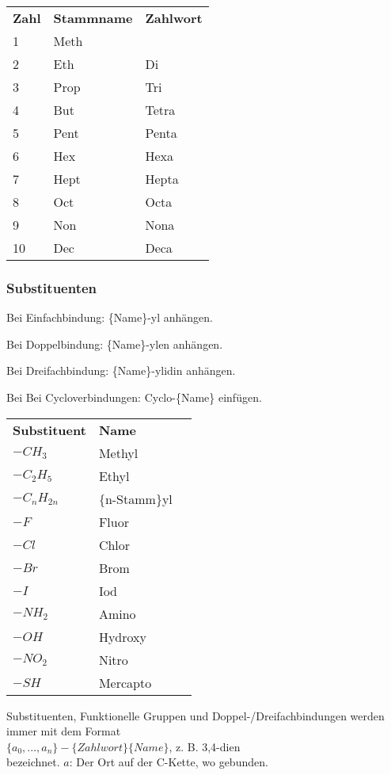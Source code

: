 \begin{center}
	\begin{tabular}{ l  l  l }
		\textbf{Zahl} & \textbf{Stammname} & \textbf{Zahlwort} \\
		1 & Meth & \\
		2 & Eth & Di\\
		3 & Prop & Tri\\
		4 & But & Tetra\\
		5 & Pent & Penta\\
		6 & Hex & Hexa\\
		7 & Hept & Hepta\\
		8 & Oct & Octa\\
		9 & Non &Nona\\
		10 & Dec &Deca\\
	\end{tabular}
\end{center}

\subsubsection{Substituenten}

Bei Einfachbindung: \{Name\}-yl anhängen.

Bei Doppelbindung:  \{Name\}-ylen anhängen.

Bei Dreifachbindung:  \{Name\}-ylidin anhängen.

Bei Bei Cycloverbindungen:  Cyclo-\{Name\} einfügen.

\begin{center}
	\begin{tabular}{ l  l  l }
		\textbf{Substituent} & \textbf{Name} \\
		$-CH_3$ & Methyl \\
		$-C_2H_5$ & Ethyl \\
		$-C_nH_{2n}$ & \{n-Stamm\}yl \\
		$-F$ & Fluor \\
		$-Cl$ & Chlor \\
		$-Br$ & Brom \\
		$-I$ & Iod \\
		$-NH_2$ & Amino \\
		$-OH$ & Hydroxy \\
		$-NO_2$ & Nitro \\
		$-SH$ & Mercapto \\
	\end{tabular}
\end{center}

\begin{note}
	Substituenten, Funktionelle Gruppen und Doppel-/Dreifachbindungen werden immer mit dem Format \\
	
	$\{a_0,...,a_n\}-\{Zahlwort\}\{Name\}$, z. B. 3,4-dien \\
	
	bezeichnet. 
	$a$: Der Ort auf der C-Kette, wo gebunden.
\end{note}

